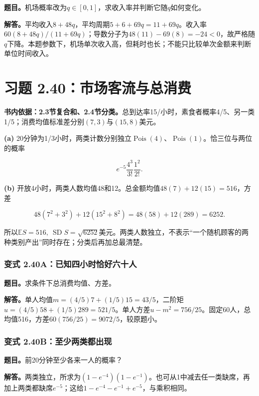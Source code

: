 \documentclass[12pt,a4paper,UTF8,fontset=fandol]{ctexart}
\begin{document}
\textbf{题目。}机场概率改为\(q\in[0,1]\)，求收入率并判断它随\(q\)如何变化。

\textbf{解答。}平均收入\(8+48q\)，平均周期\(5+6+69q=11+69q\)。收入率\(60(8+48q)/(11+69q)\)；导数分子为\(48(11)-69(8)=-24<0\)，故严格随\(q\)下降。本题参数下，机场单次收入高，但耗时也长；不能只比较单次金额来判断单位时间收入。

\section{习题
2.40：市场客流与总消费}\label{ux4e60ux9898-2.40ux5e02ux573aux5ba2ux6d41ux4e0eux603bux6d88ux8d39}

\textbf{书内依据：2.3节复合和、2.4节分类。}总到达率15/小时，素食者概率4/5、另一类1/5；消费均值标准差分别\((7,3)\)与\((15,8)\)美元。

\textbf{(a)}
20分钟为1/3小时，两类计数分别独立\(\operatorname{Pois}(4)\)、\(\operatorname{Pois}(1)\)。恰三位与两位的概率

\[\boxed{e^{-5}\frac{4^3}{3!}\frac{1^2}{2!}.}\]

\textbf{(b)}
开放4小时，两类人数均值48和12。总金额均值\(48(7)+12(15)=516\)，方差

\[48(7^2+3^2)+12(15^2+8^2)=48(58)+12(289)=6252.\]

所以\(\boxed{\mathbb ES=516,\ \operatorname{SD}S=\sqrt{6252}}\)美元。两类人数独立，不表示``一个随机顾客的两种类别产出''同时存在；分类后再加总最清楚。

\subsubsection{变式
2.40A：已知四小时恰好六十人}\label{ux53d8ux5f0f-2.40aux5df2ux77e5ux56dbux5c0fux65f6ux6070ux597dux516dux5341ux4eba}

\textbf{题目。}求条件下总消费均值、方差。

\textbf{解答。}单人均值\(m=(4/5)7+(1/5)15=43/5\)，二阶矩\(u=(4/5)58+(1/5)289=521/5\)。单人方差\(u-m^2=756/25\)。固定60人，总均值516，方差\(60(756/25)=9072/5\)，较原题小。

\subsubsection{变式
2.40B：至少两类都出现}\label{ux53d8ux5f0f-2.40bux81f3ux5c11ux4e24ux7c7bux90fdux51faux73b0}

\textbf{题目。}前20分钟至少各来一人的概率？

\textbf{解答。}两类独立，所求为\((1-e^{-4})(1-e^{-1})\)。也可从1中减去任一类缺席，再加上两类都缺席\(e^{-5}\)；这给\(1-e^{-4}-e^{-1}+e^{-5}\)，与乘积相同。
\end{document}
